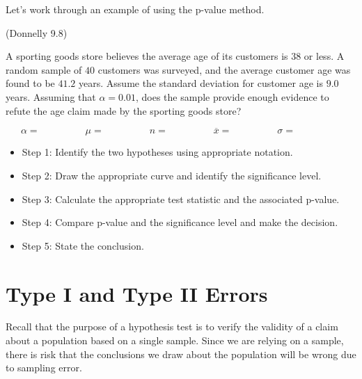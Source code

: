 \documentclass[12pt, letterpaper]{article}
\newcounter{exercise}
\theoremstyle{definition}
\begin{document}
\noindent Let's work through an example of using the p-value method.

\begin{exercise}  (Donnelly 9.8)

A sporting goods store believes the average age of its customers is $38$ or less.  A random sample of $40$ customers was surveyed, and the average customer age was found to be $41.2$ years.  Assume the standard deviation for customer age is $9.0$ years.  Assuming that $\alpha = 0.01$, does the sample provide enough evidence to refute the age claim made by the sporting goods store?

$$ \alpha=~~~~~~~~~~~~~~~~~~~~~ \mu = ~~~~~~~~~~~~~~~~~~~~~ n = ~~~~~~~~~~~~~~~~~~~~~ \overline{x} = ~~~~~~~~~~~~~~~~~~~~~ \sigma = ~~~~~~~~~~~~~~~~~~~~~ $$


\end{exercise}


\begin{itemize}

\item Step 1:  Identify the two hypotheses using appropriate notation.

\vfill

\item Step 2:  Draw the appropriate curve and identify the significance level.

\vfill

\item Step 3:  Calculate the appropriate test statistic and the associated p-value.

\vfill

\item Step 4:  Compare p-value and the significance level and make the decision.

\vfill

\item Step 5:  State the conclusion.

\vfill


\end{itemize}


\newpage

\section*{Type I and Type II Errors}

\noindent Recall that the purpose of a hypothesis test is to verify the validity of a claim about a population based on a single sample.  Since we are relying on a sample, there is risk that the conclusions we draw about the population will be wrong due to sampling error.
\end{document}
